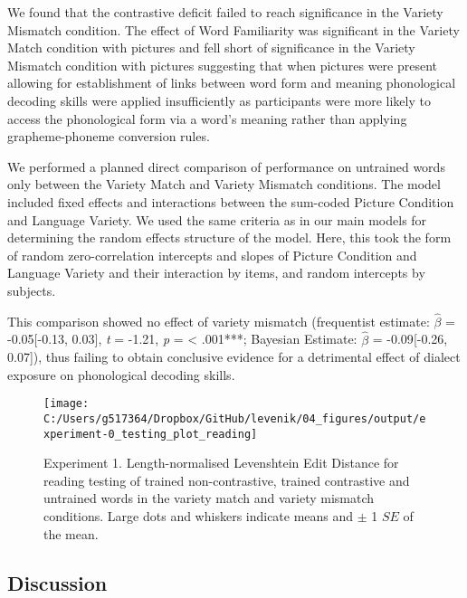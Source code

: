 \documentclass[doc,floatsintext]{apa6}
\begin{document}
We found that the contrastive deficit failed to reach significance in
the Variety Mismatch condition. The effect of Word Familiarity was
significant in the Variety Match condition with pictures and fell short
of significance in the Variety Mismatch condition with pictures
suggesting that when pictures were present allowing for establishment of
links between word form and meaning phonological decoding skills were
applied insufficiently as participants were more likely to access the
phonological form via a word's meaning rather than applying
grapheme-phoneme conversion rules.

We performed a planned direct comparison of performance on untrained
words only between the Variety Match and Variety Mismatch conditions.
The model included fixed effects and interactions between the sum-coded
Picture Condition and Language Variety. We used the same criteria as in
our main models for determining the random effects structure of the
model. Here, this took the form of random zero-correlation intercepts
and slopes of Picture Condition and Language Variety and their
interaction by items, and random intercepts by subjects.

This comparison showed no effect of variety mismatch (frequentist
estimate: \(\hat{\beta}\) = -0.05{[}-0.13, 0.03{]}, \emph{t} = -1.21,
\emph{p} = \textless{} .001***; Bayesian Estimate: \(\hat{\beta}\) =
-0.09{[}-0.26, 0.07{]}), thus failing to obtain conclusive evidence for
a detrimental effect of dialect exposure on phonological decoding
skills.

\begin{figure}[htb]

{\centering \texttt{[image: C:/Users/g517364/Dropbox/GitHub/levenik/04\_figures/output/experiment-0\_testing\_plot\_reading]} 

}

\caption{Experiment 1. Length-normalised Levenshtein Edit Distance for reading testing of trained non-contrastive, trained contrastive and untrained words in the variety match and variety mismatch conditions. Large dots and whiskers indicate means and $\pm$ 1 $SE$ of the mean.}\label{fig:ex0-test-plots}
\end{figure}

\subsection{Discussion}\label{discussion}
\end{document}
